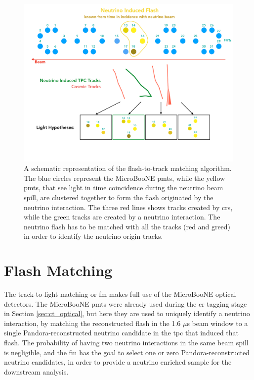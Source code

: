 \begin{figure}[]
\centering
\includegraphics[width=1.0\textwidth]{images/Reconstruction/fm_initial_2}
\caption[Flash-to-track Matching Sketch]{A schematic representation of the flash-to-track matching algorithm. The blue circles represent the MicroBooNE \acrshort{pmt}s, while the yellow \acrshort{pmt}s, that see light in time coincidence during the neutrino beam spill, are clustered together to form the flash originated by the neutrino interaction. The three red lines shows tracks created by \acrshort{cr}s, while the green tracks are created by a neutrino interaction. The neutrino flash has to be matched with all the tracks (red and greed) in order to identify the neutrino origin tracks.}
\label{fig:fm_initial}
\end{figure}


\section{Flash Matching}
\label{sec:flashmatch}

The track-to-light matching or \acrfull{fm} makes full use of the MicroBooNE optical detectors. The MicroBooNE \acrshort{pmt}s were already used during the \acrshort{cr} tagging stage in Section \ref{sec:ct_optical}, but here they are used to uniquely identify a neutrino interaction, by matching the reconstructed flash in the 1.6 $\mu$s beam window to a single Pandora-reconstructed neutrino candidate in the \acrshort{tpc} that induced that flash.
The probability of having two neutrino interactions in the same beam spill is negligible, and the \acrshort{fm} has the goal to select one or zero Pandora-reconstructed neutrino candidates, in order to provide a neutrino enriched sample for the downstream analysis.


